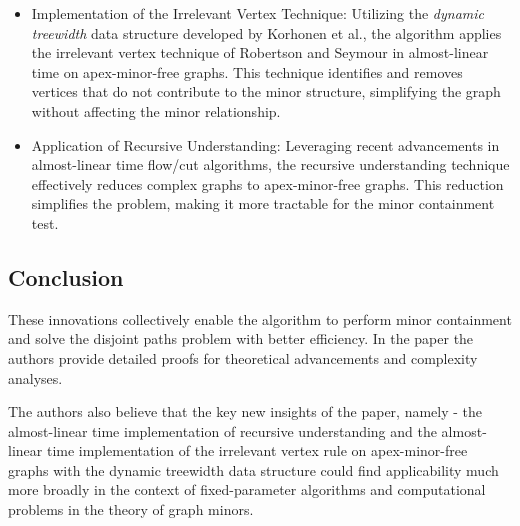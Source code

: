 \begin{itemize}
    \item 
    Implementation of the Irrelevant Vertex Technique: Utilizing the \textit{dynamic treewidth} data structure developed by Korhonen et al., the algorithm applies the irrelevant vertex technique of Robertson and Seymour in almost-linear time on apex-minor-free graphs. This technique identifies and removes vertices that do not contribute to the minor structure, simplifying the graph without affecting the minor relationship.
\item Application of Recursive Understanding: Leveraging recent advancements in almost-linear time flow/cut algorithms, the recursive understanding technique effectively reduces complex graphs to apex-minor-free graphs. This reduction simplifies the problem, making it more tractable for the minor containment test.
\end{itemize}

\subsection{Conclusion}
These innovations collectively enable the algorithm to perform minor containment and solve the disjoint paths problem with better efficiency. In the paper the authors provide detailed proofs for theoretical advancements and complexity analyses.

The authors also believe that the key new insights of the paper, namely - the almost-linear time implementation of recursive understanding and the almost-linear time implementation of the irrelevant vertex rule on apex-minor-free graphs with the dynamic treewidth data structure could find applicability much more broadly in the context of fixed-parameter algorithms and computational problems in the theory of graph minors.



